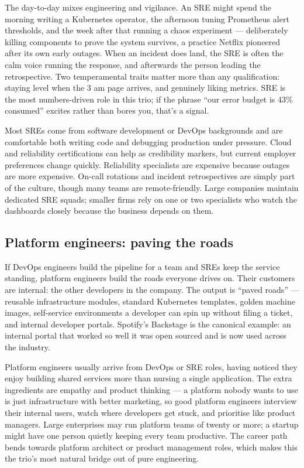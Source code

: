 The day-to-day mixes engineering and vigilance. An SRE might spend the morning writing a Kubernetes operator, the afternoon tuning Prometheus alert thresholds, and the week after that running a chaos experiment — deliberately killing components to prove the system survives, a practice Netflix pioneered after its own early outages. When an incident does land, the SRE is often the calm voice running the response, and afterwards the person leading the retrospective. Two temperamental traits matter more than any qualification: staying level when the 3 am page arrives, and genuinely liking metrics. SRE is the most numbers-driven role in this trio; if the phrase ``our error budget is 43\% consumed'' excites rather than bores you, that's a signal.


Most SREs come from software development or DevOps backgrounds and are comfortable both writing code and debugging production under pressure. Cloud and reliability certifications can help as credibility markers, but current employer preferences change quickly. Reliability specialists are expensive because outages are more expensive. On-call rotations and incident retrospectives are simply part of the culture, though many teams are remote-friendly. Large companies maintain dedicated SRE squads; smaller firms rely on one or two specialists who watch the dashboards closely because the business depends on them.



\subsection{Platform engineers: paving the roads}


If DevOps engineers build the pipeline for a team and SREs keep the service standing, platform engineers build the roads everyone drives on. Their customers are internal: the other developers in the company. The output is ``paved roads'' — reusable infrastructure modules, standard Kubernetes templates, golden machine images, self-service environments a developer can spin up without filing a ticket, and internal developer portals. Spotify's Backstage is the canonical example: an internal portal that worked so well it was open sourced and is now used across the industry.


Platform engineers usually arrive from DevOps or SRE roles, having noticed they enjoy building shared services more than nursing a single application. The extra ingredients are empathy and product thinking — a platform nobody wants to use is just infrastructure with better marketing, so good platform engineers interview their internal users, watch where developers get stuck, and prioritise like product managers. Large enterprises may run platform teams of twenty or more; a startup might have one person quietly keeping every team productive. The career path bends towards platform architect or product management roles, which makes this the trio's most natural bridge out of pure engineering.


